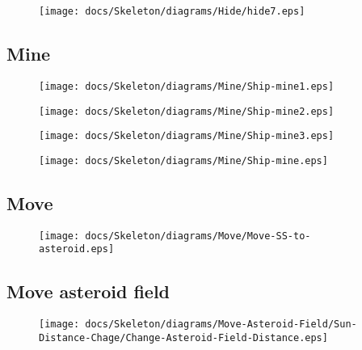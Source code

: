 \begin{figure}[H] 
    \centering 
    \texttt{[image: docs/Skeleton/diagrams/Hide/hide7.eps]} 
    \caption{} 
\end{figure} 

\subsection{Mine}

\begin{figure}[H] 
    \centering 
    \texttt{[image: docs/Skeleton/diagrams/Mine/Ship-mine1.eps]} 
    \caption{} 
\end{figure} 

\begin{figure}[H] 
    \centering 
    \texttt{[image: docs/Skeleton/diagrams/Mine/Ship-mine2.eps]} 
    \caption{} 
\end{figure} 

\begin{figure}[H] 
    \centering 
    \texttt{[image: docs/Skeleton/diagrams/Mine/Ship-mine3.eps]} 
    \caption{} 
\end{figure} 

\begin{figure}[H] 
    \centering 
    \texttt{[image: docs/Skeleton/diagrams/Mine/Ship-mine.eps]} 
    \caption{} 
\end{figure} 


\subsection{Move}


\begin{figure}[H] 
    \centering 
    \texttt{[image: docs/Skeleton/diagrams/Move/Move-SS-to-asteroid.eps]} 
    \caption{} 
\end{figure} 

\subsection{Move asteroid field}

\begin{figure}[H] 
    \centering 
    \texttt{[image: docs/Skeleton/diagrams/Move-Asteroid-Field/Sun-Distance-Chage/Change-Asteroid-Field-Distance.eps]} 
    \caption{} 
\end{figure} 

